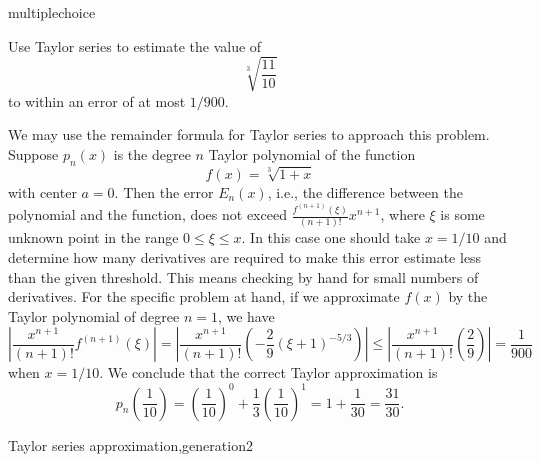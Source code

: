 \documentclass{ximera}
\begin{document}
\begin{question}[TAp0]
\begin{type}
multiplechoice
\end{type}
Use Taylor series to estimate the value of
\[\sqrt[3]{\frac{11}{10}}\] to within an error of at most \(1/900\).
\begin{multiplechoice}
\end{multiplechoice}
\begin{feedback}
We may use the remainder formula for Taylor series to approach this problem.
Suppose \(p_n(x)\) is the degree \(n\) Taylor polynomial of the function
\[ f(x) = \sqrt[3]{1+x}\]
with center \(a=0\). Then the error \(E_n(x)\), i.e., the difference between the polynomial and the function, does not exceed \(\frac{f^{(n+1)}(\xi)}{(n+1)!}x^{n+1}\), where \(\xi\) is some unknown point  in the range \(0 \leq \xi \leq x\). In this case one should take \(x = 1/10\) and determine how many derivatives are required to make this error estimate less than the given threshold. This means checking by hand for small numbers of derivatives. For the specific problem at hand, if we approximate \(f(x)\) by the Taylor polynomial of degree \( n = 1\), we have 
\[ \left| \frac{x^{n+1} }{(n+1)!} f^{(n+1)}(\xi) \right| = \left| \frac{x^{n+1}}{(n+1)!} \left( -\frac{2}{9} (\xi+1)^{-5/3} \right) \right| \leq \left| \frac{x^{n+1}}{(n+1)!} \left( \frac{2}{9} \right) \right| = \frac{1}{900} \] when \(x = 1/10\).
We conclude that the correct Taylor approximation is
\[ p_n \left( \frac{1}{10}\right) =  \left(\frac{1}{10}\right)^{0} + \frac{1}{3}\left(\frac{1}{10}\right)^{1} =  1 + \frac{1}{30} = \frac{31}{30}.\]
\end{feedback}
\begin{keywords}
Taylor series approximation,generation2
\end{keywords}
\end{question}
\end{document}
